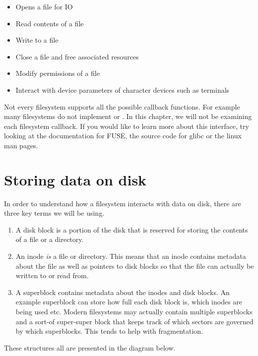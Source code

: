 \begin{itemize}
  \item {} Opens a file for IO
  \item {} Read contents of a file
  \item {} Write to a file
  \item {} Close a file and free associated resources
  \item {} Modify permissions of a file
  \item {} Interact with device parameters of character devices such as terminals
\end{itemize}

Not every filesystem supports all the possible callback functions. For example many filesystems do not implement  or . In this chapter, we will not be examining each filesystem callback. If you would like to learn more about this interface, try looking at the documentation for FUSE, the source code for glibc or the linux man pages.

\section{Storing data on disk}

In order to understand how a filesystem interacts with data on disk, there are three key terms we will be using.
\begin{enumerate}
  \item {} A disk block is a portion of the disk that is reserved for storing the contents of a file or a directory.
  \item {} An inode \emph{is} a file or directory. This means that an inode contains metadata about the file as well as pointers to disk blocks so that the file can actually be written to or read from.
  \item {} A superblock contains metadata about the inodes and disk blocks. An example superblock can store how full each disk block is, which inodes are being used etc. Modern filesystems may actually contain multiple superblocks and a sort-of super-super block that keeps track of which sectors are governed by which superblocks. This tends to help with fragmentation.
\end{enumerate}

These structures all are presented in the diagram below.


